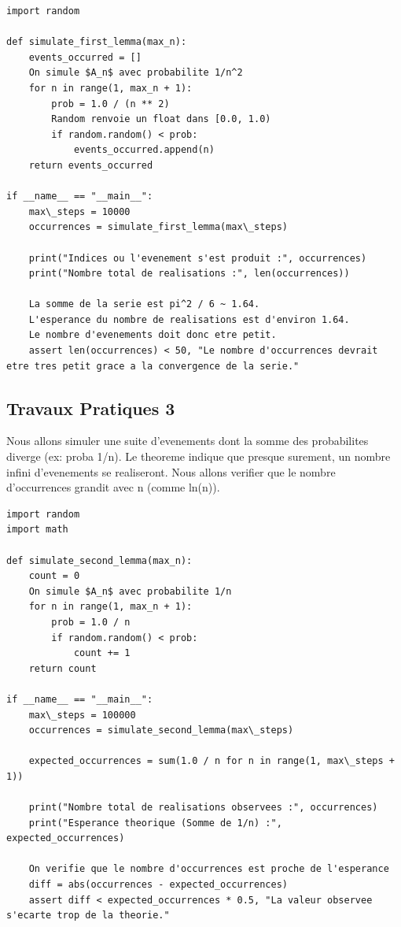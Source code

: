 \documentclass[11pt,a4paper]{article}
\begin{document}
\begin{lstlisting}
import random

def simulate_first_lemma(max_n):
    events_occurred = []
    On simule $A_n$ avec probabilite 1/n^2
    for n in range(1, max_n + 1):
        prob = 1.0 / (n ** 2)
        Random renvoie un float dans [0.0, 1.0)
        if random.random() < prob:
            events_occurred.append(n)
    return events_occurred

if __name__ == "__main__":
    max\_steps = 10000
    occurrences = simulate_first_lemma(max\_steps)

    print("Indices ou l'evenement s'est produit :", occurrences)
    print("Nombre total de realisations :", len(occurrences))

    La somme de la serie est pi^2 / 6 ~ 1.64.
    L'esperance du nombre de realisations est d'environ 1.64.
    Le nombre d'evenements doit donc etre petit.
    assert len(occurrences) < 50, "Le nombre d'occurrences devrait etre tres petit grace a la convergence de la serie."
\end{lstlisting}


\subsection*{Travaux Pratiques 3}
Nous allons simuler une suite d'evenements dont la somme des probabilites diverge (ex: proba 1/n).
Le theoreme indique que presque surement, un nombre infini d'evenements se realiseront.
Nous allons verifier que le nombre d'occurrences grandit avec n (comme ln(n)).

\begin{lstlisting}
import random
import math

def simulate_second_lemma(max_n):
    count = 0
    On simule $A_n$ avec probabilite 1/n
    for n in range(1, max_n + 1):
        prob = 1.0 / n
        if random.random() < prob:
            count += 1
    return count

if __name__ == "__main__":
    max\_steps = 100000
    occurrences = simulate_second_lemma(max\_steps)

    expected_occurrences = sum(1.0 / n for n in range(1, max\_steps + 1))

    print("Nombre total de realisations observees :", occurrences)
    print("Esperance theorique (Somme de 1/n) :", expected_occurrences)

    On verifie que le nombre d'occurrences est proche de l'esperance
    diff = abs(occurrences - expected_occurrences)
    assert diff < expected_occurrences * 0.5, "La valeur observee s'ecarte trop de la theorie."
\end{lstlisting}
\end{document}
